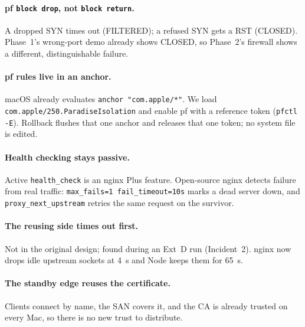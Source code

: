 \documentclass[11pt,a4paper]{article}
\begin{document}
\paragraph{pf \texttt{block drop}, not \texttt{block return}.}
A dropped SYN times out (FILTERED); a refused SYN gets a RST (CLOSED). Phase~1's wrong-port demo
already shows CLOSED, so Phase~2's firewall shows a different, distinguishable failure.

\paragraph{pf rules live in an anchor.}
macOS already evaluates \texttt{anchor "com.apple/*"}. We load
\texttt{com.apple/250.ParadiseIsolation} and enable pf with a reference token (\texttt{pfctl -E}).
Rollback flushes that one anchor and releases that one token; no system file is edited.

\paragraph{Health checking stays passive.}
Active \texttt{health\_check} is an nginx Plus feature. Open-source nginx detects failure from real
traffic: \texttt{max\_fails=1 fail\_timeout=10s} marks a dead server down, and
\texttt{proxy\_next\_upstream} retries the same request on the survivor.

\paragraph{The reusing side times out first.}
Not in the original design; found during an Ext~D run (Incident~2). nginx now drops idle upstream
sockets at 4~s and Node keeps them for 65~s.

\paragraph{The standby edge reuses the certificate.}
Clients connect by name, the SAN covers it, and the CA is already trusted on every Mac, so there
is no new trust to distribute.
\end{document}
